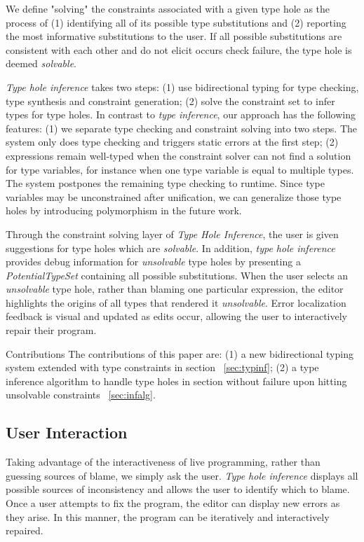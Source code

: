 We define "solving" the constraints associated with a given type hole as the process of (1) identifying all of its possible type substitutions and (2) reporting the most informative substitutions to the user. If all possible substitutions are consistent with each other and do not elicit occurs check failure, the type hole is deemed \emph{solvable}.

\emph{Type hole inference} takes two steps: (1) use bidirectional typing for type checking, type synthesis and constraint generation; (2) solve the constraint set to infer types for type holes. In contrast to \emph{type inference}, our approach has the following features: (1) we separate type checking and constraint solving into two steps. The system only does type checking and triggers static errors at the first step; (2) expressions remain well-typed when the constraint solver can not find a solution for type variables, for instance when one type variable is equal to multiple types. The system postpones the remaining type checking to runtime. Since  type variables may be unconstrained after unification, we can generalize those type holes by introducing polymorphism in the future work. 

Through the constraint solving layer of \emph{Type Hole Inference}, the user is given suggestions for type holes which are \textit{solvable}. In addition, \emph{type hole inference} provides debug information for \emph{unsolvable} type holes by presenting a \emph{PotentialTypeSet} containing all possible substitutions. When the user selects an \emph{unsolvable} type hole, rather than blaming one particular expression, the editor highlights the origins of all types that rendered it \emph{unsolvable}. Error localization feedback is visual and updated as edits occur, allowing the user to interactively repair their program.

\par{Contributions} The contributions of this paper are: (1) a new bidirectional typing system extended with type constraints in section ~\ref{sec:typinf}; (2) a type inference algorithm to handle type holes in section without failure upon hitting unsolvable constraints ~\ref{sec:infalg}.

\subsection{User Interaction}

Taking advantage of the interactiveness of live programming, rather than guessing sources of blame, we simply ask the user. \emph{Type hole inference} displays all possible sources of inconsistency and allows the user to identify which to blame. Once a user attempts to fix the program, the editor can display new errors as they arise. In this manner, the program can be iteratively and interactively repaired. 

